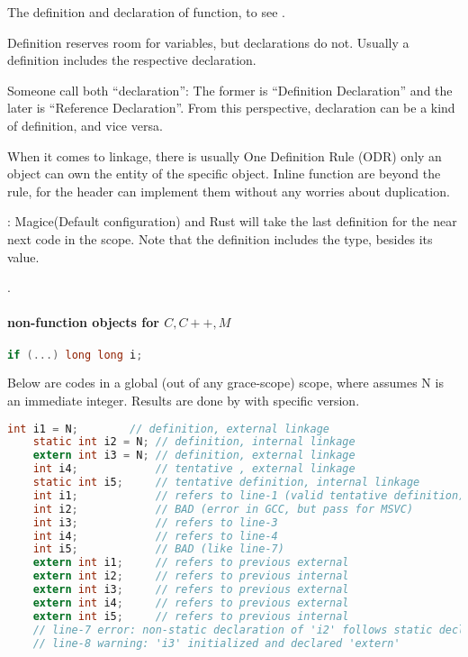 
The definition and declaration of function, to see .

Definition reserves room for variables, but declarations do not.
Usually a definition includes the respective declaration.

Someone call both “declaration”: The former is “Definition Declaration” and the later is “Reference Declaration”. From this perspective, declaration can be a kind of definition, and vice versa. %

When it comes to linkage, there is usually One Definition Rule (ODR) \textemdash only an object can own the entity of the specific object. %
Inline function are beyond the rule, for the header can implement them without any worries about duplication.

:
Magice(Default configuration) and {Rust} will take the last definition for the near next code in the scope.
Note that the definition includes the type, besides its value.

 .

\paragraph{non-function objects for $C,C++,M$}

\lstset{style=GlobalC}
\begin{lstlisting}[language=C]
	if (...) long long i;
\end{lstlisting}

Below are codes in a global (out of any grace-scope) scope, where assumes N is an immediate integer. Results are done by  with specific version.
\lstset{style=GlobalC}
\begin{lstlisting}[language=C]
	int i1 = N;        // definition, external linkage
	static int i2 = N; // definition, internal linkage
	extern int i3 = N; // definition, external linkage
	int i4;            // tentative , external linkage
	static int i5;     // tentative definition, internal linkage
	int i1;            // refers to line-1 (valid tentative definition)
	int i2;            // BAD (error in GCC, but pass for MSVC)
	int i3;            // refers to line-3
	int i4;            // refers to line-4
	int i5;            // BAD (like line-7)
	extern int i1;     // refers to previous external
	extern int i2;     // refers to previous internal
	extern int i3;     // refers to previous external
	extern int i4;     // refers to previous external
	extern int i5;     // refers to previous internal
	// line-7 error: non-static declaration of 'i2' follows static declaration
	// line-8 warning: 'i3' initialized and declared 'extern'
\end{lstlisting}

